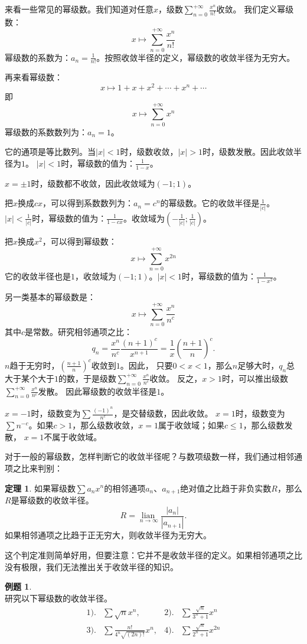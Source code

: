 \documentclass[12pt,UTF8]{ctexbook}
\newcommand{\lian}[1]{
    \underset{#1}{\operatorname{lian}\,}
}
\newcommand{\qu}[2]{\displaystyle\left(#1;#2\right)}
\theoremstyle{definition}
\newtheorem{tm}{定理}[section]
\newtheorem{et}{例题}[section]
\theoremstyle{plain}
\begin{document}
来看一些常见的幂级数。我们知道对任意$x$，级数$\sum_{n=0}^{+\infty} \frac{x^n}{n!}$收敛。
我们定义幂级数：
$$ x \mapsto \sum_{n=0}^{+\infty} \frac{x^n}{n!} $$
幂级数的系数为：$a_n = \frac{1}{n!}$。按照收敛半径的定义，幂级数的收敛半径为无穷大。

再来看幂级数：
$$ x \mapsto 1 + x + x^2 + \cdots + x^n + \cdots $$
即
$$ x \mapsto \sum_{n=0}^{+\infty} x^n $$
幂级数的系数数列为：$a_n = 1$。

它的通项是等比数列。当$|x|<1$时，级数收敛，$|x|>1$时，级数发散。因此收敛半径为$1$。
$|x|<1$时，幂级数的值为：$\frac{1}{1 - x}$。

$x = \pm 1$时，级数都不收敛，因此收敛域为$(-1;1)$。

把$x$换成$cx$，可以得到系数数列为：$a_n = c^n$的幂级数。它的收敛半径是$\frac{1}{|c|}$。
$|x|<\frac{1}{|c|}$时，幂级数的值为：$\frac{1}{1 - cx}$。收敛域为$\qu{-\frac{1}{|c|}}{\frac{1}{|c|}}$。

把$x$换成$x^2$，可以得到幂级数：
$$ x \mapsto \sum_{n=0}^{+\infty} x^{2n} $$
它的收敛半径也是$1$，收敛域为$(-1;1)$。$|x|<1$时，幂级数的值为：$\frac{1}{1 - x^2}$。

另一类基本的幂级数是：
$$ x \mapsto \sum_{n=0}^{+\infty} \frac{x^n}{n^c}$$
其中$c$是常数。研究相邻通项之比：
$$ q_n = \frac{x^n}{n^c} \frac{(n+1)^c}{x^{n+1}} = \frac{1}{x} \left(\frac{n+1}{n}\right)^c. $$
$n$趋于无穷时，$\displaystyle \left(\frac{n+1}{n}\right)^c$收敛到$1$。因此，
只要$0<x<1$，那么$n$足够大时，$q_n$总大于某个大于$1$的数，于是级数$\sum_{n=0}^{+\infty} \frac{x^n}{n^c}$收敛。
反之，$x>1$时，可以推出级数$\sum_{n=0}^{+\infty} \frac{x^n}{n^c}$发散。
因此幂级数的收敛半径是$1$。

$x=-1$时，级数变为$\sum \frac{(-1)^n}{n^c}$，是交替级数，因此收敛。
$x=1$时，级数变为$\sum n^{-c}$。如果$c>1$，那么级数收敛，$x=1$属于收敛域；如果$c\leqslant 1$，那么级数发散，
$x=1$不属于收敛域。

对于一般的幂级数，怎样判断它的收敛半径呢？与数项级数一样，我们通过相邻通项之比来判别：

\begin{tm}
    如果幂级数$\sum a_n x^n$的相邻通项$a_n$、$a_{n+1}$绝对值之比趋于非负实数$R$，那么$R$是幂级数的收敛半径。
    $$ R = \lian{n\to\infty} \frac{|a_n|}{|a_{n+1}|}. $$
    如果相邻通项之比趋于正无穷大，则收敛半径为无穷大。
\end{tm}

这个判定准则简单好用，但要注意：它并不是收敛半径的定义。如果相邻通项之比没有极限，我们无法推出关于收敛半径的知识。

\begin{et}    
    \mbox{} \\
    研究以下幂级数的收敛半径。\\
    \begin{align*}
        1).& \sum \sqrt{n} x^n,  &2).& \sum \frac{\sqrt{n}}{3^n + 1} x^n \\
        3).& \sum \frac{n!}{4^n\sqrt{(2n)!}} x^n,  & 4).& \sum \frac{\sqrt{n}}{2^n+1} x^{2n} 
    \end{align*}
\end{et}
\end{document}
